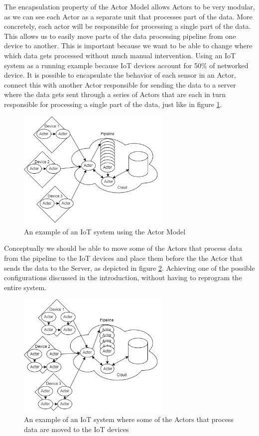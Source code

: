 \documentclass[a4paper]{article}
\begin{document}
The encapsulation property of the Actor Model allows Actors to be very modular, as we can see each Actor as a separate unit that processes part of the data. More concretely, each actor will be responsible for processing a single part of the data. This allows us to easily move parts of the data processing pipeline from one device to another. This is important because we want to be able to change where which data gets processed without much manual intervention. Using an IoT system as a running example because IoT devices account for 50\% of networked device\cite{differentnetworkneedsiot}. It is possible to encapsulate the behavior of each sensor in an Actor, connect this with another Actor responsible for sending the data to a server where the data gets sent through a series of Actors that are each in turn responsible for processing a single part of the data, just like in figure \ref{fig:iotActorExample1}.
\begin{figure}[H]
    \centering
    \includegraphics[width=0.65\textwidth]{iotActorExample1.png}
    \caption{An example of an IoT system using the Actor Model}
    \label{fig:iotActorExample1}
\end{figure}
Conceptually we should be able to move some of the Actors that process data from the pipeline to the IoT devices and place them before the the Actor that sends the data to the Server, as depicted in figure \ref{fig:iotActorExample2}. Achieving one of the possible configurations discussed in the introduction, without having to reprogram the entire system.
\begin{figure}[H]
    \centering
    \includegraphics[width=0.65\textwidth]{iotActorsMoved.png}
    \caption{An example of an IoT system where some of the Actors that process data are moved to the IoT devices}
    \label{fig:iotActorExample2}
\end{figure}
\end{document}
